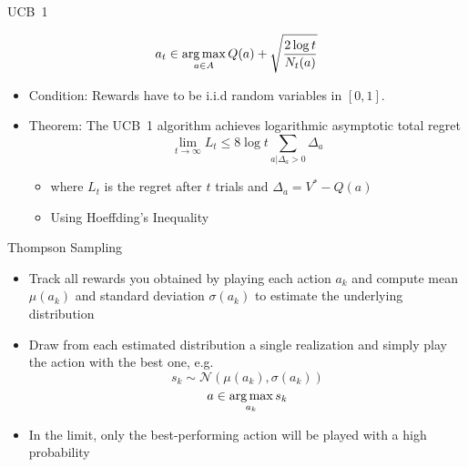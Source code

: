 \documentclass[aspectratio=169]{../latex_main/tntbeamer}  %
\begin{document}
\begin{frame}[c]{UCB~1}
	
			$$a_t \in \operatorname*{arg\,max}_{a \in A} Q(a) + \sqrt{\frac{2\log t }{N_t(a)}} $$
	
	\begin{itemize}

		\item Condition: Rewards have to be i.i.d random variables in $[0,1]$.
		\pause
		\item Theorem: The UCB~1 algorithm achieves logarithmic asymptotic total regret
		$$\lim_{t\to \infty} L_t \leq 8 \log t \sum_{a|\Delta_a>0} \Delta_a $$
		\begin{itemize}
			\item where $L_t$ is the regret after $t$ trials and $\Delta_a = V^* - Q(a)$
			\item Using Hoeffding's Inequality
		\end{itemize}
	\end{itemize}
	
\end{frame}
\begin{frame}[c]{Thompson Sampling}
	
	\begin{itemize}
		\item Track all rewards you obtained by playing each action $a_k$ and compute mean $\mu(a_k)$ and standard deviation $\sigma(a_k)$ to estimate the underlying distribution
		\item Draw from each estimated distribution a single realization and simply play the action with the best one, e.g.
		$$ s_k \sim \mathcal{N}(\mu(a_k), \sigma(a_k))$$
		$$ a \in \operatorname*{arg\,max}_{a_k} s_k$$
		\item In the limit, only the best-performing action will be played with a high probability
	\end{itemize}
	
\end{frame}
\end{document}
